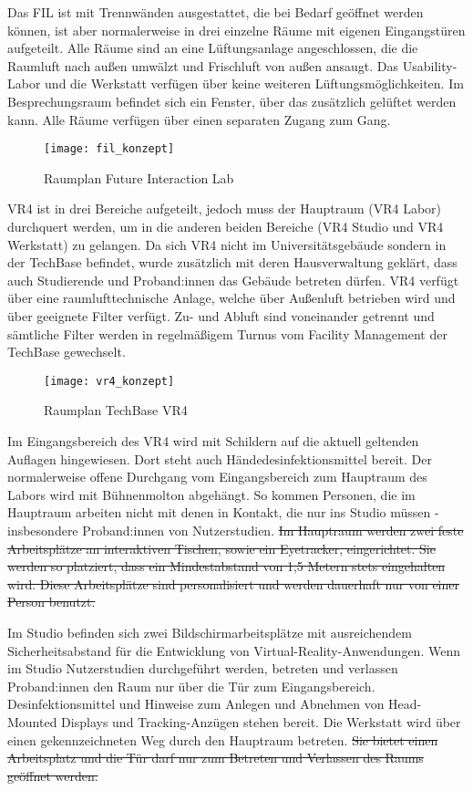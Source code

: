 \noindent
Das FIL ist mit Trennwänden ausgestattet, die bei Bedarf geöffnet werden können, ist aber normalerweise in drei einzelne Räume mit eigenen Eingangstüren aufgeteilt.
Alle Räume sind an eine Lüftungsanlage angeschlossen, die die Raumluft nach außen umwälzt und Frischluft von außen ansaugt.
Das Usability-Labor und die Werkstatt verfügen über keine weiteren Lüftungsmöglichkeiten.
Im Besprechungsraum befindet sich ein Fenster, über das zusätzlich gelüftet werden kann.
Alle Räume verfügen über einen separaten Zugang zum Gang. 

\medskip
\begin{figure}[h]
    \label{fig:raumplan_fil}
    \centering
    \texttt{[image: fil\_konzept]}
    \caption{Raumplan Future Interaction Lab}
\end{figure}

\noindent
VR4 ist in drei Bereiche aufgeteilt, jedoch muss der Hauptraum (VR4 Labor) durchquert werden, um in die anderen beiden Bereiche (VR4 Studio und VR4 Werkstatt) zu gelangen. Da sich VR4 nicht im Universitätsgebäude sondern in der TechBase befindet, wurde zusätzlich mit deren Hausverwaltung geklärt, dass auch Studierende und Proband:innen das Gebäude betreten dürfen.
VR4 verfügt über eine raumlufttechnische Anlage, welche über Außenluft betrieben wird und über geeignete Filter verfügt.
Zu- und Abluft sind voneinander getrennt und sämtliche Filter werden in regelmäßigem Turnus vom Facility Management der TechBase gewechselt.

\medskip
\begin{figure}[h]
    \label{fig:raumplan_vr4}
    \centering
    \texttt{[image: vr4\_konzept]}
    \caption{Raumplan TechBase VR4}
\end{figure}

Im Eingangsbereich des VR4 wird mit Schildern auf die aktuell geltenden Auflagen hingewiesen.
Dort steht auch Händedesinfektionsmittel bereit.
Der normalerweise offene Durchgang vom Eingangsbereich zum Hauptraum des Labors wird mit Bühnenmolton abgehängt.
So kommen Personen, die im Hauptraum arbeiten nicht mit denen in Kontakt, die nur ins Studio müssen - insbesondere Proband:innen von Nutzerstudien.
\sout{Im Hauptraum werden zwei feste Arbeitsplätze an interaktiven Tischen, sowie ein Eyetracker, eingerichtet. Sie werden so platziert, dass ein Mindestabstand von 1,5 Metern stets eingehalten wird. Diese Arbeitsplätze sind personalisiert und werden dauerhaft nur von einer Person benutzt.}

Im Studio befinden sich zwei Bildschirmarbeitsplätze mit ausreichendem Sicherheitsabstand für die Entwicklung von Virtual-Reality-Anwendungen.
Wenn im Studio Nutzerstudien durchgeführt werden, betreten und verlassen Proband:innen den Raum nur über die Tür zum Eingangsbereich.
Desinfektionsmittel und Hinweise zum Anlegen und Abnehmen von Head-Mounted Displays und Tracking-Anzügen stehen bereit.
Die Werkstatt wird über einen gekennzeichneten Weg durch den Hauptraum betreten.
\sout{Sie bietet einen Arbeitsplatz und die Tür darf nur zum Betreten und Verlassen des Raums geöffnet werden.}


